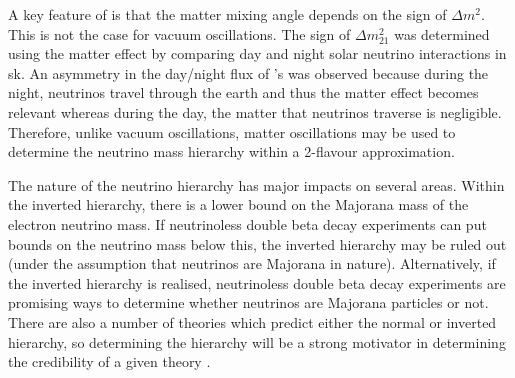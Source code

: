 A key feature of  is that the matter mixing angle depends on the sign of $\Delta m^2$. This is not the case for vacuum oscillations. The sign of $\Delta m^2_{21}$ was determined using the matter effect by comparing day and night solar neutrino interactions in \gls{sk}. An asymmetry in the day/night flux of \nue's was observed because during the night, neutrinos travel through the earth and thus the matter effect becomes relevant whereas during the day, the matter that neutrinos traverse is negligible. Therefore, unlike vacuum oscillations, matter oscillations may be used to determine the neutrino mass hierarchy within a 2-flavour approximation.

The nature of the neutrino hierarchy has major impacts on several areas. Within the inverted hierarchy, there is a lower bound on the Majorana mass of the electron neutrino mass. If neutrinoless double beta decay experiments can put bounds on the neutrino mass below this, the inverted hierarchy may be ruled out (under the assumption that neutrinos are Majorana in nature). Alternatively, if the inverted hierarchy is realised, neutrinoless double beta decay experiments are promising ways to determine whether neutrinos are Majorana particles or not. There are also a number of theories which predict either the normal or inverted hierarchy, so determining the hierarchy will be a strong motivator in determining the credibility of a given theory \cite{mass_hierarchy}.


